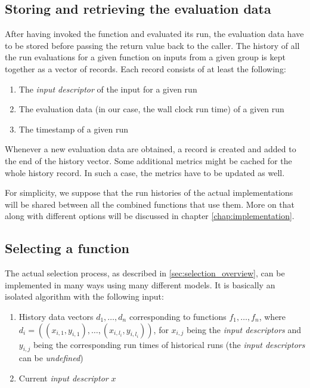 \subsection{Storing and retrieving the evaluation data}
\label{subsec:storing_evaluation_data}

After having invoked the function and evaluated its run, the evaluation data have to be stored before passing the return value back to the caller. The history of all the run evaluations for a given function on inputs from a given group is kept together as a vector of records. Each record consists of at least the following:

\begin{enumerate}
	\item The \textit{input descriptor} of the input for a given run
	\item The evaluation data (in our case, the wall clock run time) of a given run
	\item The timestamp of a given run
\end{enumerate}

Whenever a new evaluation data are obtained, a record is created and added to the end of the history vector. Some additional metrics might be cached for the whole history record. In such a case, the metrics have to be updated as well.

For simplicity, we suppose that the run histories of the actual implementations will be shared between all the combined functions that use them. More on that along with different options will be discussed in chapter \ref{chap:implementation}.

\subsection{Selecting a function}
\label{subsec:selecting_function}

The actual selection process, as described in \ref{sec:selection_overview}, can be implemented in many ways using many different models. It is basically an isolated algorithm with the following input:
\begin{enumerate}
	\item History data vectors $d_1,\dots,d_n$ corresponding to functions $f_1,\dots,f_n$, where $d_i = ((x_{i,1}, y_{i,1}),\dots,(x_{i,l_i}, y_{i,l_i}))$, for $x_{i,j}$ being the \textit{input descriptors} and $y_{i,j}$ being the corresponding run times of historical runs (the \textit{input descriptors} can be \textit{undefined})
	\item Current \textit{input descriptor} $x$
\end{enumerate}

